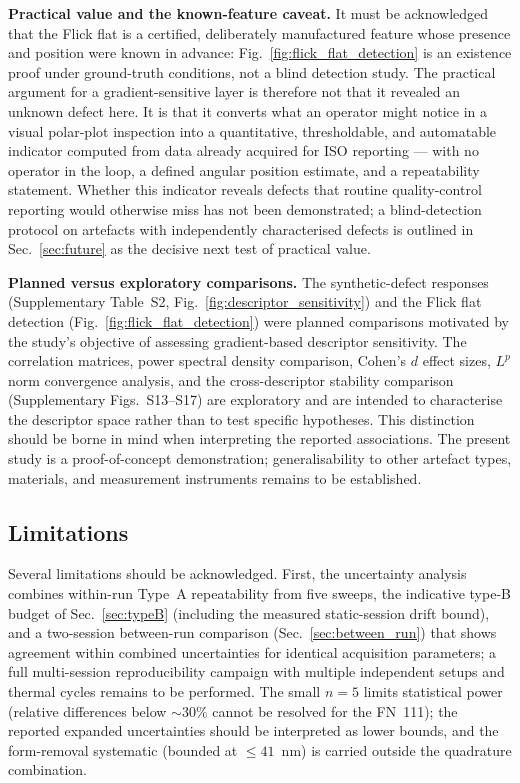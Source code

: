 \documentclass[review]{elsarticle}
\begin{document}
\textbf{Practical value and the known-feature caveat.} It must be acknowledged that the Flick flat is a certified, deliberately manufactured feature whose presence and position were known in advance: Fig.~\ref{fig:flick_flat_detection} is an existence proof under ground-truth conditions, not a blind detection study. The practical argument for a gradient-sensitive layer is therefore not that it revealed an unknown defect here. It is that it converts what an operator might notice in a visual polar-plot inspection into a quantitative, thresholdable, and automatable indicator computed from data already acquired for ISO reporting — with no operator in the loop, a defined angular position estimate, and a repeatability statement. Whether this indicator reveals defects that routine quality-control reporting would otherwise miss has not been demonstrated; a blind-detection protocol on artefacts with independently characterised defects is outlined in Sec.~\ref{sec:future} as the decisive next test of practical value.

\textbf{Planned versus exploratory comparisons.} The synthetic-defect responses (Supplementary Table~S2, Fig.~\ref{fig:descriptor_sensitivity}) and the Flick flat detection (Fig.~\ref{fig:flick_flat_detection}) were planned comparisons motivated by the study's objective of assessing gradient-based descriptor sensitivity. The correlation matrices, power spectral density comparison, Cohen's $d$ effect sizes, $L^p$ norm convergence analysis, and the cross-descriptor stability comparison (Supplementary Figs.~S13--S17) are exploratory and are intended to characterise the descriptor space rather than to test specific hypotheses. This distinction should be borne in mind when interpreting the reported associations. The present study is a proof-of-concept demonstration; generalisability to other artefact types, materials, and measurement instruments remains to be established.

\subsection{Limitations}
Several limitations should be acknowledged. First, the uncertainty analysis combines within-run Type~A repeatability from five sweeps, the indicative type-B budget of Sec.~\ref{sec:typeB} (including the measured static-session drift bound), and a two-session between-run comparison (Sec.~\ref{sec:between_run}) that shows agreement within combined uncertainties for identical acquisition parameters; a full multi-session reproducibility campaign with multiple independent setups and thermal cycles remains to be performed. The small $n=5$ limits statistical power (relative differences below $\sim30\%$ cannot be resolved for the FN~111); the reported expanded uncertainties should be interpreted as lower bounds, and the form-removal systematic (bounded at $\leq41$~nm) is carried outside the quadrature combination.
\end{document}

